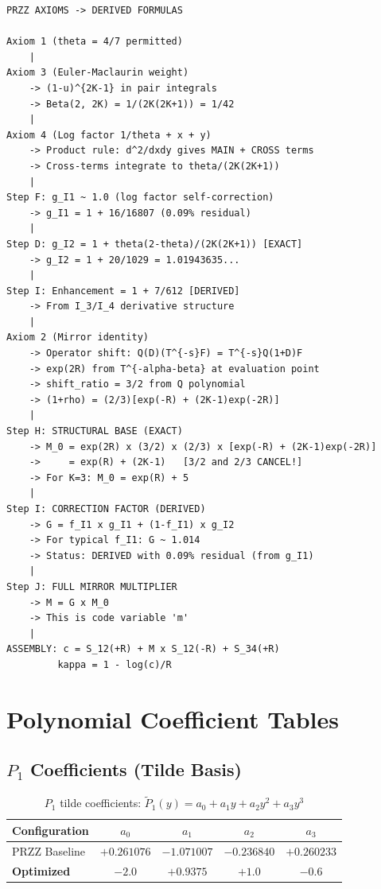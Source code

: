 \documentclass[11pt]{article}
\begin{document}
\begin{verbatim}
PRZZ AXIOMS -> DERIVED FORMULAS

Axiom 1 (theta = 4/7 permitted)
    |
Axiom 3 (Euler-Maclaurin weight)
    -> (1-u)^{2K-1} in pair integrals
    -> Beta(2, 2K) = 1/(2K(2K+1)) = 1/42
    |
Axiom 4 (Log factor 1/theta + x + y)
    -> Product rule: d^2/dxdy gives MAIN + CROSS terms
    -> Cross-terms integrate to theta/(2K(2K+1))
    |
Step F: g_I1 ~ 1.0 (log factor self-correction)
    -> g_I1 = 1 + 16/16807 (0.09% residual)
    |
Step D: g_I2 = 1 + theta(2-theta)/(2K(2K+1)) [EXACT]
    -> g_I2 = 1 + 20/1029 = 1.01943635...
    |
Step I: Enhancement = 1 + 7/612 [DERIVED]
    -> From I_3/I_4 derivative structure
    |
Axiom 2 (Mirror identity)
    -> Operator shift: Q(D)(T^{-s}F) = T^{-s}Q(1+D)F
    -> exp(2R) from T^{-alpha-beta} at evaluation point
    -> shift_ratio = 3/2 from Q polynomial
    -> (1+rho) = (2/3)[exp(-R) + (2K-1)exp(-2R)]
    |
Step H: STRUCTURAL BASE (EXACT)
    -> M_0 = exp(2R) x (3/2) x (2/3) x [exp(-R) + (2K-1)exp(-2R)]
    ->     = exp(R) + (2K-1)   [3/2 and 2/3 CANCEL!]
    -> For K=3: M_0 = exp(R) + 5
    |
Step I: CORRECTION FACTOR (DERIVED)
    -> G = f_I1 x g_I1 + (1-f_I1) x g_I2
    -> For typical f_I1: G ~ 1.014
    -> Status: DERIVED with 0.09% residual (from g_I1)
    |
Step J: FULL MIRROR MULTIPLIER
    -> M = G x M_0
    -> This is code variable 'm'
    |
ASSEMBLY: c = S_12(+R) + M x S_12(-R) + S_34(+R)
         kappa = 1 - log(c)/R
\end{verbatim}

\section{Polynomial Coefficient Tables}
\label{app:coeffs}

\subsection{$P_1$ Coefficients (Tilde Basis)}

\begin{table}[h]
\centering
\caption{$P_1$ tilde coefficients: $\tilde{P}_1(y) = a_0 + a_1 y + a_2 y^2 + a_3 y^3$}
\begin{tabular}{lcccc}
\toprule
Configuration & $a_0$ & $a_1$ & $a_2$ & $a_3$ \\
\midrule
PRZZ Baseline & $+0.261076$ & $-1.071007$ & $-0.236840$ & $+0.260233$ \\
\textbf{Optimized} & $\mathbf{-2.0}$ & $\mathbf{+0.9375}$ & $\mathbf{+1.0}$ & $\mathbf{-0.6}$ \\
\bottomrule
\end{tabular}
\end{table}
\end{document}
